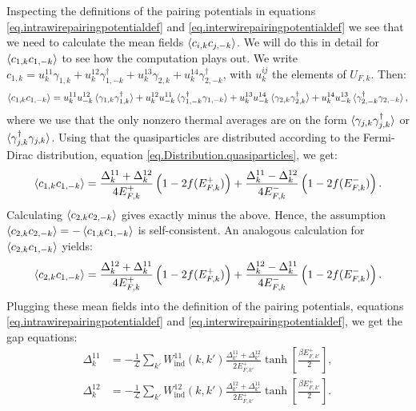 Inspecting the definitions of the pairing potentials in equations \eqref{eq.intrawirepairingpotentialdef} and \eqref{eq.interwirepairingpotentialdef} we see that we need to calculate the mean fields $\braket{ c_{i, k} c_{j,-k} }$. We will do this in detail for $\braket{c_{1,k}c_{1,-k}}$ to see how the computation plays out. We write $c_{1,k} = u^{11}_{k} \gamma_{1,k} + u^{12}_{k} \gamma^\dagger_{1,-k} + u^{13}_{k} \gamma_{2,k} + u^{14}_{k} \gamma^\dagger_{2,-k}$, with $u^{ij}_k$ the elements of $U_{F,k}$. Then:
\begin{equation}
\braket{c_{1,k}c_{1,-k}} = u^{11}_{k}u^{12}_{-k}\braket{\gamma_{1,k}\gamma^\dagger_{1,k}} + u^{12}_{k}u^{11}_{-k}\braket{\gamma^\dagger_{1,-k}\gamma_{1,-k}} + u^{13}_{k}u^{14}_{-k}\braket{\gamma_{2,k}\gamma^\dagger_{2,k}} + u^{14}_{k}u^{13}_{-k}\braket{\gamma^\dagger_{2,-k}\gamma_{2,-k}}, \nonumber
\end{equation}
where we use that the only nonzero thermal averages are on the form $\braket{\gamma_{j,k}\gamma^\dagger_{j,k}}$ or $\braket{\gamma^\dagger_{j,k}\gamma_{j,k}}$. Using that the quasiparticles are distributed according to the Fermi-Dirac distribution, equation \eqref{eq.Distribution.quasiparticles}, we get:
\begin{equation}
\braket{c_{1,k}c_{1,-k}} = \frac{\Delta^{11}_k + \Delta^{12}_k}{4E^{+}_{F,k}}\left(1 - 2f(E^{+}_{F,k})\right) + \frac{\Delta^{11}_k - \Delta^{12}_k}{4E^{-}_{F,k}}\left(1 - 2f(E^{-}_{F,k})\right). 
\label{eq.meanfield11}
\end{equation}
Calculating $\braket{c_{2,k}c_{2,-k}}$ gives exactly minus the above. Hence, the assumption $\braket{c_{2,k}c_{2,-k}} = -\braket{c_{1,k}c_{1,-k}}$ is self-consistent. An analogous calculation for $\braket{c_{2,k}c_{1,-k}}$ yields:
\begin{equation}
\braket{c_{2,k}c_{1,-k}} = \frac{\Delta^{12}_k + \Delta^{11}_k}{4E^{+}_{F,k}}\left(1 - 2f(E^{+}_{F,k})\right) + \frac{\Delta^{12}_k - \Delta^{11}_k}{4E^{-}_{F,k}}\left(1 - 2f(E^{-}_{F,k})\right). 
\label{eq.meanfield12}
\end{equation}
Plugging these mean fields into the definition of the pairing potentials, equations \eqref{eq.intrawirepairingpotentialdef} and \eqref{eq.interwirepairingpotentialdef}, we get the gap equations:
\begin{align}
\Delta^{11}_k &= -\frac{1}{\mathcal{L}}\sum_{k'} W_{\text{ind}}^{11}(k, k')\frac{\Delta^{11}_{k'} + \Delta^{12}_{k'}}{2E^{+}_{F,k'}}\tanh\left[\frac{\beta E^{+}_{F,k'}}{2}\right], \nonumber \\
\Delta^{12}_k &= -\frac{1}{\mathcal{L}}\sum_{k'} W_{\text{ind}}^{12}(k, k')\frac{\Delta^{12}_{k'} + \Delta^{11}_{k'}}{2E^{+}_{F,k'}}\tanh\left[\frac{\beta E^{+}_{F,k'}}{2}\right].
\label{eq.2wiresgapequations}
\end{align}
